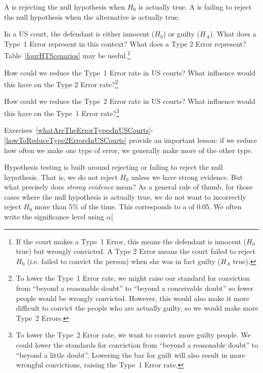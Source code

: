 A  is rejecting the null hypothesis when $H_0$ is actually true. A  is failing to reject the null hypothesis when the alternative is actually true.

\begin{exercise} \label{whatAreTheErrorTypesInUSCourts}
In a US court, the defendant is either innocent ($H_0$) or  guilty ($H_A$). What does a Type~1 Error represent in this context? What does a Type 2 Error represent? Table~\ref{fourHTScenarios} may be useful.\footnote{If the court makes a Type~1 Error, this means the defendant is innocent ($H_0$ true) but wrongly convicted. A Type 2 Error means the court failed to reject $H_0$ (i.e. failed to convict the person) when she was in fact guilty ($H_A$ true).}
\end{exercise}

\begin{exercise} \label{howToReduceType1ErrorsInUSCourts}
How could we reduce the Type~1 Error rate in US courts? What influence would this have on the Type 2 Error rate?\footnote{To lower the Type~1 Error rate, we might raise our standard for conviction from ``beyond a reasonable doubt'' to ``beyond a conceivable doubt'' so fewer people would be wrongly convicted. However, this would also make it more difficult to convict the people who are actually guilty, so we would make more Type~2 Errors.}
\end{exercise}

\begin{exercise} \label{howToReduceType2ErrorsInUSCourts}
How could we reduce the Type~2 Error rate in US courts? What influence would this have on the Type~1 Error rate?\footnote{To lower the Type~2 Error rate, we want to convict more guilty people. We could lower the standards for conviction from ``beyond a reasonable doubt'' to ``beyond a little doubt''. Lowering the bar for guilt will also result in more wrongful convictions, raising the Type~1 Error rate.}
\end{exercise}


Exercises~\ref{whatAreTheErrorTypesInUSCourts}-\ref{howToReduceType2ErrorsInUSCourts} provide an important lesson: if we reduce how often we make one type of error, we generally make more of the other type.

Hypothesis testing is built around rejecting or failing to reject the null hypothesis. That is, we do not reject $H_0$ unless we have strong evidence. But what precisely does \emph{strong evidence} mean? As a general rule of thumb, for those cases where the null hypothesis is actually true, we do not want to incorrectly reject $H_0$ more than 5\% of the time. This corresponds to a  of 0.05. We often write the significance level using $\alpha$\marginpar[\raggedright\vspace{-4mm}

